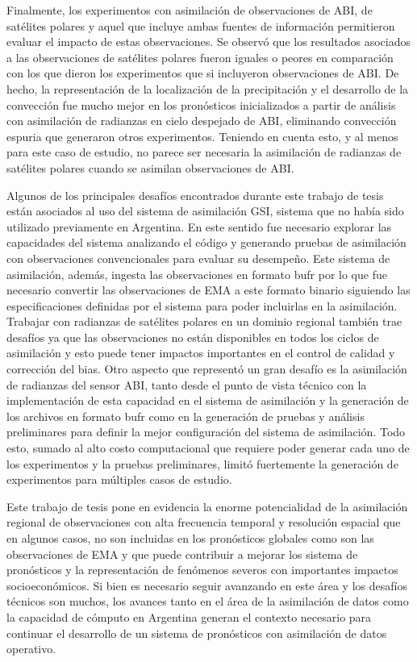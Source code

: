 \documentclass[12pt,oneside,a4paper]{reedthesis}
\begin{document}
Finalmente, los experimentos con asimilación de observaciones de ABI, de satélites polares y aquel que incluye ambas fuentes de información permitieron evaluar el impacto de estas observaciones. Se observó que los resultados asociados a las observaciones de satélites polares fueron iguales o peores en comparación con los que dieron los experimentos que si incluyeron observaciones de ABI. De hecho, la representación de la localización de la precipitación y el desarrollo de la convección fue mucho mejor en los pronósticos inicializados a partir de análisis con asimilación de radianzas en cielo despejado de ABI, eliminando convección espuria que generaron otros experimentos. Teniendo en cuenta esto, y al menos para este caso de estudio, no parece ser necesaria la asimilación de radianzas de satélites polares cuando se asimilan observaciones de ABI.

Algunos de los principales desafíos encontrados durante este trabajo de tesis están asociados al uso del sistema de asimilación GSI, sistema que no había sido utilizado previamente en Argentina. En este sentido fue necesario explorar las capacidades del sistema analizando el código y generando pruebas de asimilación con observaciones convencionales para evaluar su desempeño. Este sistema de asimilación, además, ingesta las observaciones en formato bufr por lo que fue necesario convertir las observaciones de EMA a este formato binario siguiendo las especificaciones definidas por el sistema para poder incluirlas en la asimilación. Trabajar con radianzas de satélites polares en un dominio regional también trae desafíos ya que las observaciones no están disponibles en todos los ciclos de asimilación y esto puede tener impactos importantes en el control de calidad y corrección del bias. Otro aspecto que representó un gran desafío es la asimilación de radianzas del sensor ABI, tanto desde el punto de vista técnico con la implementación de esta capacidad en el sistema de asimilación y la generación de los archivos en formato bufr como en la generación de pruebas y análisis preliminares para definir la mejor configuración del sistema de asimilación. Todo esto, sumado al alto costo computacional que requiere poder generar cada uno de los experimentos y la pruebas preliminares, limitó fuertemente la generación de experimentos para múltiples casos de estudio.

Este trabajo de tesis pone en evidencia la enorme potencialidad de la asimilación regional de observaciones con alta frecuencia temporal y resolución espacial que en algunos casos, no son incluidas en los pronósticos globales como son las observaciones de EMA y que puede contribuir a mejorar los sistema de pronósticos y la representación de fenómenos severos con importantes impactos socioeconómicos. Si bien es necesario seguir avanzando en este área y los desafíos técnicos son muchos, los avances tanto en el área de la asimilación de datos como la capacidad de cómputo en Argentina generan el contexto necesario para continuar el desarrollo de un sistema de pronósticos con asimilación de datos operativo.
\end{document}
